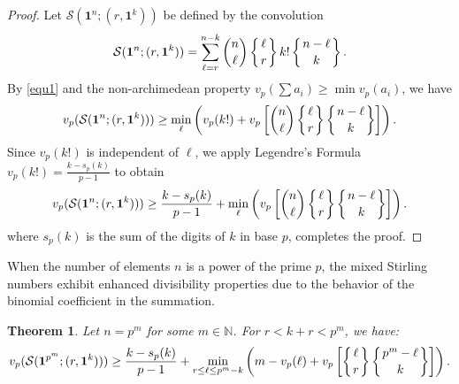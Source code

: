 \documentclass[12pt]{amsart}
\newtheorem{theorem}{Theorem}[section]
\theoremstyle{definition}
\begin{document}
\begin{proof}
Let $\mathcal{S}(\mathbf{1}^n; (r, \mathbf{1}^k))$ be defined by the convolution
\begin{equation*}
    \mathcal{S}(\mathbf{1}^n; (r, \mathbf{1}^k)) = \sum_{\ell=r}^{n-k} \binom{n}{\ell} \left\{ \genfrac{}{}{0pt}{}{\ell}{r} \right\} k! \left\{ \genfrac{}{}{0pt}{}{n-\ell}{k} \right\}.
\end{equation*}
By \ref{equ1} and the non-archimedean property $v_p(\sum a_i) \geq \min v_p(a_i)$, we have
\begin{equation*}
    v_p(\mathcal{S}(\mathbf{1}^n; (r, \mathbf{1}^k))) \geq \min_{\ell} \left( v_p(k!) + v_p\left[ \binom{n}{\ell} \left\{ \genfrac{}{}{0pt}{}{\ell}{r} \right\} \left\{ \genfrac{}{}{0pt}{}{n-\ell}{k} \right\} \right] \right).
\end{equation*}
Since $v_p(k!)$ is independent of $\ell$, we apply Legendre's Formula $v_p(k!) = \frac{k-s_p(k)}{p-1}$ to obtain
\begin{equation*}
    v_p(\mathcal{S}(\mathbf{1}^n; (r, \mathbf{1}^k))) \geq \frac{k-s_p(k)}{p-1} + \min_{\ell} \left( v_p\left[ \binom{n}{\ell} \left\{ \genfrac{}{}{0pt}{}{\ell}{r} \right\} \left\{ \genfrac{}{}{0pt}{}{n-\ell}{k} \right\} \right] \right).
\end{equation*}
where $s_p(k)$ is the sum of the digits of $k$ in base $p$, completes the proof.
\end{proof}

When the number of elements $n$ is a power of the prime $p$, the mixed Stirling numbers exhibit enhanced divisibility properties due to the behavior of the binomial coefficient in the summation.
\begin{theorem}
Let $n = p^m$ for some $m \in \mathbb{N}$. For $r < k+r < p^m$, we have:
\begin{equation*}
    v_p(\mathcal{S}(\mathbf{1}^{p^m}; (r, \mathbf{1}^k))) \geq \frac{k - s_p(k)}{p-1} + \min_{r \le \ell \le p^m-k} \left( m - v_p(\ell) + v_p\left[ \left\{ \genfrac{}{}{0pt}{}{\ell}{r} \right\} \left\{ \genfrac{}{}{0pt}{}{p^m-\ell}{k} \right\} \right] \right).
\end{equation*}
\end{theorem}
\end{document}
